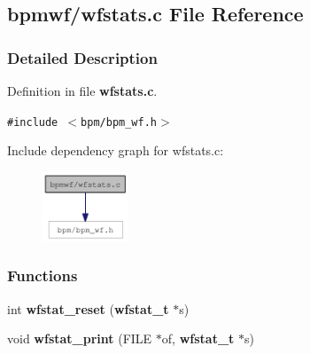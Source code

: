 \subsection{bpmwf/wfstats.c File Reference}
\label{wfstats_8c}


\subsubsection{Detailed Description}


Definition in file {\bf wfstats.c}.

{\tt \#include $<$bpm/bpm\_\-wf.h$>$}\par


Include dependency graph for wfstats.c:\nopagebreak
\begin{figure}[H]
\begin{center}
\leavevmode
\includegraphics[width=73pt]{wfstats_8c__incl}
\end{center}
\end{figure}
\subsubsection*{Functions}
\begin{CompactItemize}
\item 
int {\bf wfstat\_\-reset} ({\bf wfstat\_\-t} $\ast$s)
\item 
void {\bf wfstat\_\-print} (FILE $\ast$of, {\bf wfstat\_\-t} $\ast$s)
\end{CompactItemize}
